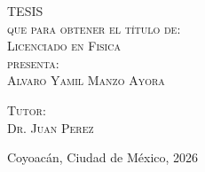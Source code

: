 \documentclass[letterpaper,12pt,oneside]{book}
\begin{document}
\begin{titlepage}
\begin{minipage}[c][0.81\textheight][t]{0.75\textwidth}
\begin{center}
                \vspace{2cm}            

                \textsc{\LARGE T\hspace{1.5cm}E\hspace{1.5cm}S\hspace{1.5cm}I\hspace{1.5cm}S}\\[0.5cm]
                \textsc{\large que para obtener el t\'itulo de:}\\[0.5cm]
                \textsc{\large Licenciado en Fisica}\\[0.5cm]
                \textsc{\large presenta:}\\[0.5cm]
                \textsc{\large {Alvaro Yamil Manzo Ayora}}\\[2cm]          

                \vspace{0.5cm}

                {\large\scshape Tutor:\\[0.3cm] {Dr. Juan Perez}}\\[.2in]

                \vspace{0.5cm}

                \large{Coyoacán}, {Ciudad de México}, {2026}
            \end{center}
        \end{minipage}
    \end{titlepage}
\end{document}

